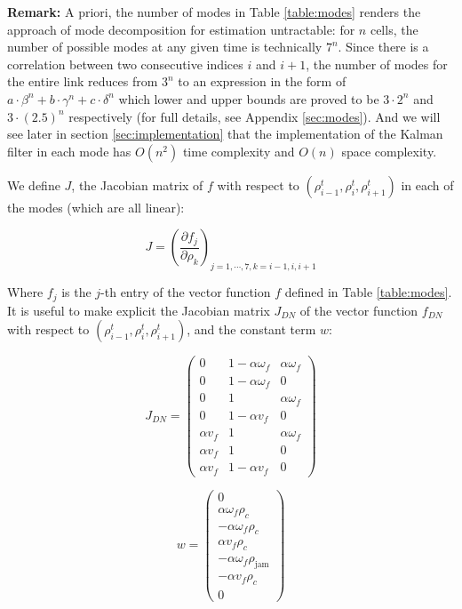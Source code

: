 \noindent \textbf{Remark:} A priori, the number of modes in Table \ref{table:modes} renders the approach of mode decomposition for estimation untractable: for $n$ cells, the number of possible modes at any given time is technically $7^{n}$. Since there is a correlation between two consecutive indices $i$ and $i+1$, the number of modes for the entire link reduces from $3^{n}$ to an expression in the form of $a\cdot\beta^{n} + b\cdot\gamma^{n} + c\cdot\delta^{n}$ which lower and upper bounds are proved to be $3\cdot 2^{n}$ and $3\cdot (2.5)^{n}$ respectively (for full details, see Appendix \ref{sec:modes}). And we will see later in section \ref{sec:implementation} that the implementation of the Kalman filter in each mode has $O(n^{2})$ time complexity and $O(n)$ space complexity.

\hspace{10mm}

We define $J$, the Jacobian matrix of $f$ with respect to $(\rho^{t}_{i-1},\rho^{t}_{i},\rho^{t}_{i+1})$ in each of the modes (which are all linear):

\begin{equation}\label{eq:jacobian}
J = \left(\frac{\partial f_{j}}{\partial \rho_{k}}\right)_{j=1,\cdots,7,k=i-1,i,i+1}
\end{equation}

\noindent Where $f_{j}$ is the $j$-th entry of the vector function $f$ defined in Table \ref{table:modes}. It is useful to make explicit the Jacobian matrix $J_{DN}$ of the vector function $f_{DN}$ with respect to $(\rho^{t}_{i-1},\rho^{t}_{i},\rho^{t}_{i+1})$, and the constant term $w$:

\begin{equation} \label{eq:jacobianDN}
J_{DN} = \left( \begin{array}{ccc}
0 & 1 - \alpha \omega_{f} & \alpha \omega_{f} \\
0 & 1 - \alpha \omega_{f} & 0 \\
0 & 1 & \alpha \omega_{f} \\
0 &  1 - \alpha v_{f} & 0 \\
\alpha v_{f} & 1 & \alpha \omega_{f} \\
\alpha v_{f} & 1 & 0 \\
\alpha v_{f} & 1 - \alpha v_{f} & 0
\end{array} \right)
\end{equation}

\begin{equation}\label{eq:jacobianDN2}
w = \left( \begin{array}{c}
0 \\
\alpha \omega_{f} \rho_{c}\\
-\alpha \omega_{f} \rho_{c}\\
\alpha v_{f} \rho_{c}\\
-\alpha \omega_{f} \rho_{\text{jam}}\\
-\alpha v_{f} \rho_{c}\\
0
\end{array} \right)
\end{equation}

